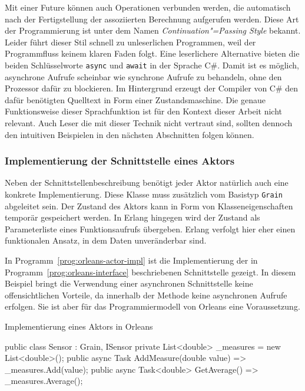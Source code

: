 Mit einer Future können auch Operationen verbunden werden, die automatisch nach der Fertigstellung der assoziierten Berechnung aufgerufen werden. Diese Art der Programmierung ist unter dem Namen \textit{Continuation"=Passing Style} bekannt. Leider führt dieser Stil schnell zu unleserlichen Programmen, weil der Programmfluss keinem klaren Faden folgt. Eine leserlichere Alternative bieten die beiden Schlüsselworte \lstinline{async} und \lstinline{await} in der Sprache C\#. Damit ist es möglich, asynchrone Aufrufe scheinbar wie synchrone Aufrufe zu behandeln, ohne den Prozessor dafür zu blockieren. Im Hintergrund erzeugt der Compiler von C\# den dafür benötigten Quelltext in Form einer Zustandsmaschine. Die genaue Funktionsweise dieser Sprachfunktion ist für den Kontext dieser Arbeit nicht relevant. Auch Leser die mit dieser Technik nicht vertraut sind, sollten dennoch den intuitiven Beispielen in den nächsten Abschnitten folgen können.

\subsubsection{Implementierung der Schnittstelle eines Aktors}

Neben der Schnittstellenbeschreibung benötigt jeder Aktor natürlich auch eine konkrete Implementierung. Diese Klasse muss zusätzlich vom Basistyp \lstinline{Grain} abgeleitet sein. Der Zustand des Aktors kann in Form von Klasseneigenschaften temporär gespeichert werden. In Erlang hingegen wird der Zustand als Parameterliste eines Funktionsaufrufs übergeben. Erlang verfolgt hier eher einen funktionalen Ansatz, in dem Daten unveränderbar sind.

In Programm~\ref{prog:orleans-actor-impl} ist die Implementierung der in Programm~\ref{prog:orleans-interface} beschriebenen Schnittstelle gezeigt. In diesem Beispiel bringt die Verwendung einer asynchronen Schnittstelle keine offensichtlichen Vorteile, da innerhalb der Methode keine asynchronen Aufrufe erfolgen. Sie ist aber für das Programmiermodell von Orleans eine Voraussetzung.

\begin{program}[!hbt]
\caption{Implementierung eines Aktors in Orleans}
\label{prog:orleans-actor-impl}
\begin{CsCode}
public class Sensor : Grain, ISensor {
	private List<double> _measures = new List<double>();
	public async Task AddMeasure(double value) => _measures.Add(value);
	public async Task<double> GetAverage() => _measures.Average();
}
\end{CsCode}
\end{program}

